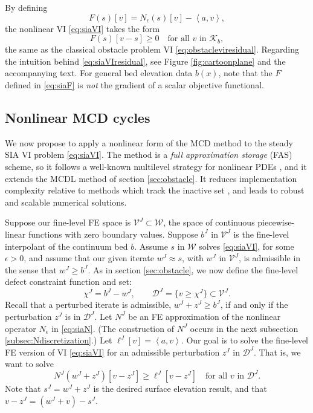 \documentclass[letterpaper,final,12pt,reqno]{amsart}
\theoremstyle{claim}
\newcommand{\eps}{\epsilon}
\newcommand{\ip}[2]{\left<#1,#2\right>}
\numberwithin{equation}{section}
\numberwithin{figure}{section}
\numberwithin{table}{section}
\numberwithin{theorem}{section}
\begin{document}
By defining
\begin{equation}
F(s)[v] = N_\eps(s)[v] - \ip{a}{v}, \label{eq:siaF}
\end{equation}
the nonlinear VI \eqref{eq:siaVI} takes the form
\begin{equation}
F(s)[v-s] \ge 0 \quad \text{for all } v \text{ in } \mathcal{K}_b, \label{eq:siaVIresidual}
\end{equation}
the same as the classical obstacle problem VI \eqref{eq:obstacleviresidual}.  Regarding the intuition behind \eqref{eq:siaVIresidual}, see Figure \ref{fig:cartoonplane} and the accompanying text.  For general bed elevation data $b(x)$, note that the $F$ defined in \eqref{eq:siaF} is \emph{not} the gradient of a scalar objective functional.

\subsection{Nonlinear MCD cycles} \label{subsec:mcdn}  We now propose to apply a nonlinear form of the MCD method to the steady SIA VI problem \eqref{eq:siaVI}.  The method is a \emph{full approximation storage} (FAS) scheme, so it follows a well-known multilevel strategy for nonlinear PDEs \cite{Briggsetal2000,Trottenbergetal2001}, and it extends the MCDL method of section \ref{sec:obstacle}.  It reduces implementation complexity relative to methods which track the inactive set \cite{Bueler2016,Jouvetetal2013,JouvetGraeser2013}, and leads to robust and scalable numerical solutions.

Suppose our fine-level FE space is $\mathcal{V}^J \subset \mathcal{W}$, the space of continuous piecewise-linear functions with zero boundary values.  Suppose $b^J$ in $\mathcal{V}^J$ is the fine-level interpolant of the continuum bed $b$.  Assume $s$ in $\mathcal{W}$ solves \eqref{eq:siaVI}, for some $\eps>0$, and assume that our given iterate $w^J\approx s$, with $w^J$ in $\mathcal{V}^J$, is admissible in the sense that $w^J \ge b^J$.  As in section \ref{sec:obstacle}, we now define the fine-level defect constraint function and set:
    $$\chi^J = b^J - w^J, \qquad \mathcal{D}^J = \{v\ge \chi^J\} \subset \mathcal{V}^J.$$
Recall that a perturbed iterate is admissible, $w^J + z^J \ge b^J$, if and only if the perturbation $z^J$ is in $\mathcal{D}^J$.  Let $N^J$ be an FE approximation of the nonlinear operator $N_\eps$ in \eqref{eq:siaN}.  (The construction of $N^J$ occurs in the next subsection \ref{subsec:Ndiscretization}.)  Let $\ell^J[v] = \ip{a}{v}$.  Our goal is to solve the fine-level FE version of VI \eqref{eq:siaVI} for an admissible perturbation $z^J$ in $\mathcal{D}^J$.  That is, we want to solve
\begin{equation}
N^J(w^J+z^J)[v-z^J] \ge \ell^J[v-z^J] \quad \text{for all $v$ in $\mathcal{D}^J$.} \label{eq:siaVIFEfinelevel}
\end{equation}
Note that $s^J=w^J+z^J$ is the desired surface elevation result, and that $v - z^J = (w^J+v)-s^J$.
\end{document}
